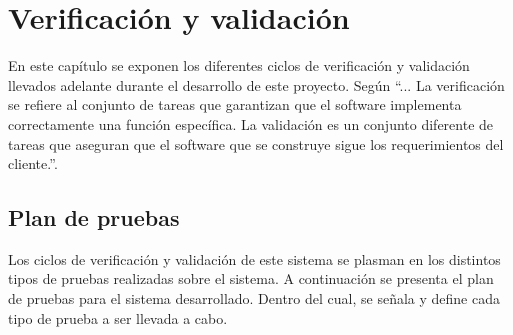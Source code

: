 \chapter{Verificación y validación}
\label{CapituloPruebas}
\par En este capítulo se exponen los diferentes ciclos de verificación y validación llevados adelante durante el desarrollo de este proyecto. Según \cite{Press10} ``... La verificación se refiere al conjunto de tareas que garantizan que el software implementa correctamente una función específica. La validación es un conjunto diferente de tareas que aseguran que el software que se construye sigue los requerimientos del cliente.''.


\section{Plan de pruebas}
\par Los ciclos de verificación y validación de este sistema se plasman en los distintos tipos de pruebas realizadas sobre el sistema. A continuación se presenta el plan de pruebas para el sistema desarrollado. Dentro del cual, se señala y define cada tipo de prueba a ser llevada a cabo. 

